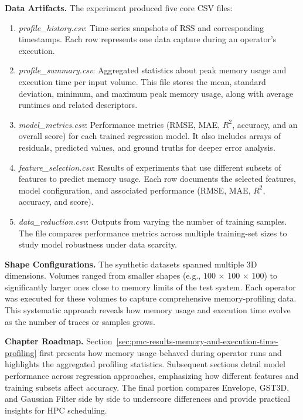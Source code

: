 \vspace{1em}
\noindent
\textbf{Data Artifacts.}
The experiment produced five core \ac{CSV} files:
\begin{enumerate}
    \item \emph{profile\_history.csv}:
    Time-series snapshots of \ac{RSS} and corresponding timestamps.
    Each row represents one data capture during an operator’s execution.
    \item \emph{profile\_summary.csv}:
    Aggregated statistics about peak memory usage and execution time per input volume.
    This file stores the mean, standard deviation, minimum, and maximum peak memory usage, along with average runtimes and related descriptors.
    \item \emph{model\_metrics.csv}:
    Performance metrics (\ac{RMSE}, \ac{MAE}, $R^2$, accuracy, and an overall score) for each trained regression model.
    It also includes arrays of residuals, predicted values, and ground truths for deeper error analysis.
    \item \emph{feature\_selection.csv}:
    Results of experiments that use different subsets of features to predict memory usage.
    Each row documents the selected features, model configuration, and associated performance (\ac{RMSE}, \ac{MAE}, $R^2$, accuracy, and score).
    \item \emph{data\_reduction.csv}:
    Outputs from varying the number of training samples.
    The file compares performance metrics across multiple training-set sizes to study model robustness under data scarcity.
\end{enumerate}

\vspace{1em}
\noindent
\textbf{Shape Configurations.}
The synthetic datasets spanned multiple \ac{3D} dimensions.
Volumes ranged from smaller shapes (e.g., $100$ $\times$ $100$ $\times$ $100$) to significantly larger ones close to memory limits of the test system.
Each operator was executed for these volumes to capture comprehensive memory-profiling data.
This systematic approach reveals how memory usage and execution time evolve as the number of traces or samples grows.

\vspace{1em}
\noindent
\textbf{Chapter Roadmap.}
Section~\ref{sec:pmc-results-memory-and-execution-time-profiling} first presents how memory usage behaved during operator runs and highlights the aggregated profiling statistics.
Subsequent sections detail model performance across regression approaches, emphasizing how different features and training subsets affect accuracy.
The final portion compares Envelope, \ac{GST3D}, and Gaussian Filter side by side to underscore differences and provide practical insights for \ac{HPC} scheduling.



